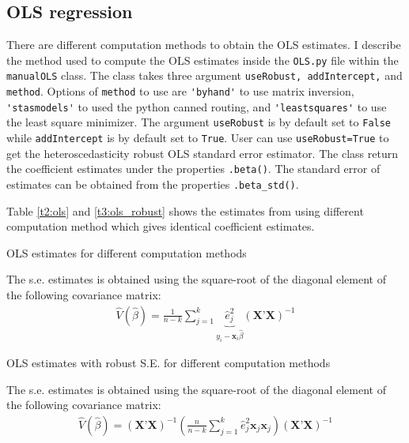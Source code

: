 \documentclass{article}
\begin{document}
\subsection{OLS regression}
There are different computation methods to obtain the OLS estimates. I describe the method used to compute the OLS estimates inside the \verb!OLS.py! file within the \verb!manualOLS! class. The class takes three argument \verb!useRobust, addIntercept,! and \verb!method!. Options of \verb!method! to use are \verb|'byhand'| to use matrix inversion, \verb|'stasmodels'| to used the python canned routing, and \verb|'leastsquares'| to use the least square minimizer. The argument \verb!useRobust! is by default set to \verb!False! while \verb!addIntercept! is by default set to \verb!True!. User can use \verb!useRobust=True! to get the heteroscedasticity robust OLS standard error estimator. The class return the coefficient estimates under the properties \verb!.beta()!. The standard error of estimates can be obtained from the properties \verb!.beta_std()!. 

Table \ref{t2:ols} and \ref{t3:ols_robust} shows the estimates from using different computation method which gives identical coefficient estimates.

\begin{table}[H]\centering
\begin{threeparttable}
    \caption{OLS estimates for different computation methods}
    \label{t2:ols}
    
    \begin{tablenotes}
    \small \item The s.e. estimates is obtained using the square-root of the diagonal element of the following covariance matrix:
    \begin{align*}
        \hat{V}(\hat{\beta})=\frac{1}{n-k}\sum_{j=1}^k \underbrace{\hat{e}_j^2}_{y_i-\textbf{x}_i\hat{\beta}}\left(\textbf{X'}\textbf{X}\right)^{-1}
    \end{align*}
    
    \end{tablenotes}
\end{threeparttable}
\end{table}

\begin{table}[H]\centering
    \begin{threeparttable}
        \caption{OLS estimates with robust S.E. for different computation methods}
        \label{t3:ols_robust}
        
        \begin{tablenotes}
        \small \item The s.e. estimates is obtained using the square-root of the diagonal element of the following covariance matrix:
    \begin{align*}
        \hat{V}(\hat{\beta})=\left(\textbf{X'}\textbf{X}\right)^{-1}\left(\frac{n}{n-k}\sum_{j=1}^k \hat{e}_j^2\textbf{x}_j\textbf{x}_j\right)\left(\textbf{X'}\textbf{X}\right)^{-1}    
        \end{align*}
        \end{tablenotes}
    \end{threeparttable}
    \end{table}
\end{document}

